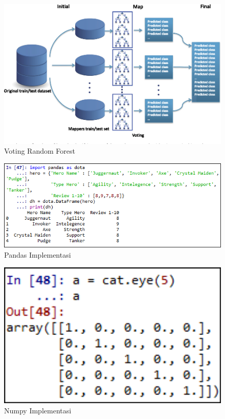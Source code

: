 \begin{figure}
	\centerline{\includegraphics[width=1\textwidth]{figures/fathi/chapter3/hari1/3.png}}
	\caption{Voting Random Forest}
	\label{fig3}
\end{figure}

\begin{figure}
	\centerline{\includegraphics[width=1\textwidth]{figures/fathi/chapter3/hari2/1.png}}
	\caption{Pandas Implementasi}
	\label{pandas}
\end{figure}

\begin{figure}
	\centerline{\includegraphics[width=1\textwidth]{figures/fathi/chapter3/hari2/21.png}}
	\caption{Numpy Implementasi}
	\label{numpy1}
\end{figure}

